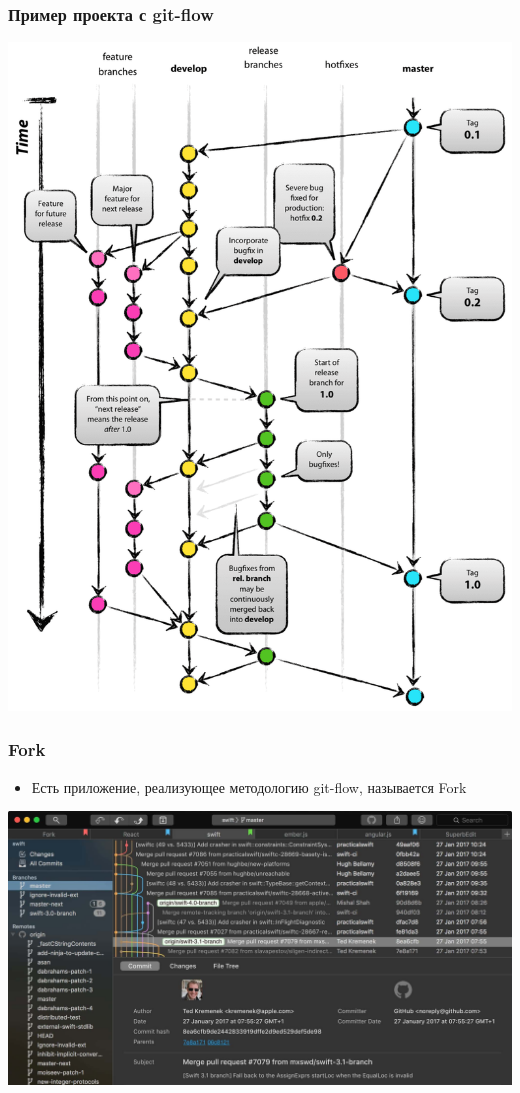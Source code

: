 \documentclass[]{beamer}
\begin{document}
\begin{frame} \frametitle{Пример проекта с git-flow}
\begin{center}
    \includegraphics[scale=0.13]{git-model@2x.png}
\end{center}
\end{frame}

\begin{frame} \frametitle{Fork}
\begin{itemize}
    \item Есть приложение, реализующее методологию git-flow, называется Fork
\end{itemize}
\begin{center}
    \includegraphics[scale=0.13]{image1.jpg}
\end{center}
\end{frame}
\end{document}
